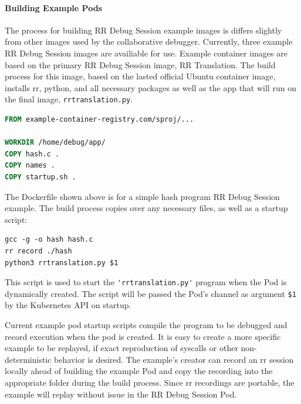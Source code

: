 \documentclass[12pt]{article}
\begin{document}
\paragraph{Building Example Pods} \label{buildingchannel}

The process for building RR Debug Session example images is differs
slightly from other images used by the collaborative debugger.
Currently, three example RR Debug Session images are availiable for
use.  Example container images are based on the primary RR Debug
Session image, RR Translation.  The build process for this image,
based on the lasted official Ubuntu container image, installs rr,
python, and all necessary packages as well as the app that will run on
the final image, \lstinline{rrtranslation.py}.\\

\begin{lstlisting}[language=Dockerfile,basicstyle=\small,caption={RR Debug Session Hash Example---Dockerfile},captionpos=b]
FROM example-container-registry.com/sproj/...
  
WORKDIR /home/debug/app/
COPY hash.c .
COPY names .
COPY startup.sh .
\end{lstlisting}

The Dockerfile shown above is for a simple hash program RR Debug
Session example.  The build process copies over any necessary files,
as well as a startup script:\\

\begin{lstlisting}[basicstyle=\linespread{0.5}\ttfamily\small,caption={Example Startup Script},captionpos=b]
gcc -g -o hash hash.c
rr record ./hash
python3 rrtranslation.py $1
\end{lstlisting}

This script is used to start the \lstinline{'rrtranslation.py'} program
when the Pod is dynamically created.  The script will be passed the
Pod's channel as argument \lstinline{$1} by the Kubernetes API on
startup.
\par

Current example pod startup scripts compile the program to be debugged
and record execution when the pod is created.  It is easy to create a
more specific example to be replayed, if exact reproduction of
syscalls or other non-deterministic behavior is desired.  The
example's creator can record an rr session locally ahead of building
the example Pod and copy the recording into the appropriate folder
during the build process.  Since rr recordings are portable, the
example will replay without issue in the RR Debug Session Pod.
\end{document}
